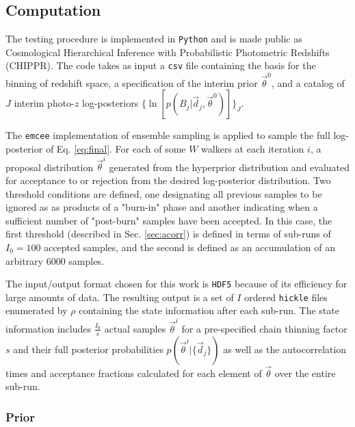 \documentclass[preprint]{aastex}
\begin{document}
\subsection{Computation}
\label{sec:mcmc}

The testing procedure is implemented in \texttt{Python} and is made public as 
Cosmological Hierarchical Inference with Probabilistic Photometric Redshifts 
(CHIPPR).  The code takes as input a \texttt{csv} file containing the basis for 
the binning of redshift space, a specification of the interim prior 
$\vec{\theta}^{0}$, and a catalog of $J$ interim photo-$z$ log-posteriors 
$\{\ln[p(B_{j}|\vec{d}_{j},\vec{\theta}^{0})]\}_{J}$.

The \texttt{emcee} \citep{Foreman-Mackey2013} implementation of ensemble 
sampling is applied to sample the full log-posterior of Eq. \ref{eq:final}.   
For each of some $W$ walkers at each iteration $i$, a proposal distribution 
$\vec{\theta}^{i}$ generated from the hyperprior distribution and evaluated for 
acceptance to or rejection from the desired log-posterior distribution.  Two 
threshold conditions are defined, one designating all previous samples to be 
ignored as as products of a "burn-in" phase and another indicating when a 
sufficient number of "post-burn" samples have been accepted.  In this case, the 
first threshold (described in Sec. \ref{sec:acorr}) is defined in terms of 
sub-runs of $I_{0}=100$ accepted samples, and the second is defined as an 
accumulation of an arbitrary 6000 samples.

The input/output format chosen for this work is \texttt{HDF5} because of its 
efficiency for large amounts of data.  The resulting output is a set of $I$ 
ordered \texttt{hickle} files enumerated by $\rho$ containing the state 
information after each sub-run.  The state information includes 
$\frac{I_{0}}{s}$ actual samples $\vec{\theta}^{i}$ for a pre-specified chain 
thinning factor $s$ and their full posterior probabilities 
$p(\vec{\theta}^{i}|\{\vec{d}_{j}\})$ as well as the autocorrelation times and 
acceptance fractions calculated for each element of $\vec{\theta}$ over the 
entire sub-run.  

\subsubsection{Prior}
\label{sec:prior}
\end{document}
